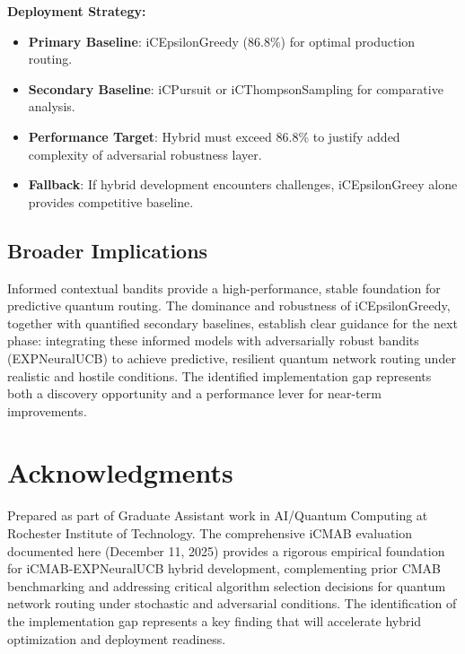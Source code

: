 \documentclass[12pt,a4paper]{article}
\begin{document}
\textbf{Deployment Strategy:}
\begin{itemize}
\item \textbf{Primary Baseline}: iCEpsilonGreedy (86.8\%) for optimal production routing.
\item \textbf{Secondary Baseline}: iCPursuit or iCThompsonSampling for comparative analysis.
\item \textbf{Performance Target}: Hybrid must exceed 86.8\% to justify added complexity of adversarial robustness layer.
\item \textbf{Fallback}: If hybrid development encounters challenges, iCEpsilonGreey alone provides competitive baseline.
\end{itemize}

\subsection{Broader Implications}

Informed contextual bandits provide a high-performance, stable foundation for predictive quantum routing. The dominance and robustness of iCEpsilonGreedy, together with quantified secondary baselines, establish clear guidance for the next phase: integrating these informed models with adversarially robust bandits (EXPNeuralUCB) to achieve predictive, resilient quantum network routing under realistic and hostile conditions. The identified implementation gap represents both a discovery opportunity and a performance lever for near-term improvements.

\newpage
\section{Acknowledgments}

Prepared as part of Graduate Assistant work in AI/Quantum Computing at Rochester Institute of Technology. The comprehensive iCMAB evaluation documented here (December 11, 2025) provides a rigorous empirical foundation for iCMAB-EXPNeuralUCB hybrid development, complementing prior CMAB benchmarking and addressing critical algorithm selection decisions for quantum network routing under stochastic and adversarial conditions. The identification of the implementation gap represents a key finding that will accelerate hybrid optimization and deployment readiness.
\end{document}
